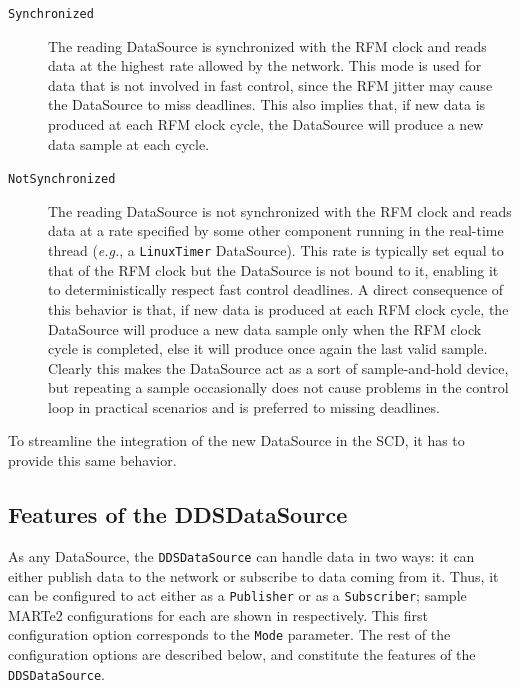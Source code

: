 \begin{description}
  \item[\texttt{Synchronized}] The reading DataSource is synchronized with the RFM clock and reads data at the highest rate allowed by the network. This mode is used for data that is not involved in fast control, since the RFM jitter may cause the DataSource to miss deadlines. This also implies that, if new data is produced at each RFM clock cycle, the DataSource will produce a new data sample at each cycle.
  \item[\texttt{NotSynchronized}] The reading DataSource is not synchronized with the RFM clock and reads data at a rate specified by some other component running in the real-time thread (\emph{e.g.}, a \texttt{LinuxTimer} DataSource). This rate is typically set equal to that of the RFM clock but the DataSource is not bound to it, enabling it to deterministically respect fast control deadlines. A direct consequence of this behavior is that, if new data is produced at each RFM clock cycle, the DataSource will produce a new data sample only when the RFM clock cycle is completed, else it will produce once again the last valid sample. Clearly this makes the DataSource act as a sort of sample-and-hold device, but repeating a sample occasionally does not cause problems in the control loop in practical scenarios and is preferred to missing deadlines.
\end{description}
To streamline the integration of the new DataSource in the SCD, it has to provide this same behavior.

\subsection{Features of the DDSDataSource}
\label{sec:ddsdatasource_features}
As any DataSource, the \texttt{DDSDataSource} can handle data in two ways: it can either publish data to the network or subscribe to data coming from it. Thus, it can be configured to act either as a \texttt{Publisher} or as a \texttt{Subscriber}; sample MARTe2 configurations for each are shown in  respectively. This first configuration option corresponds to the \texttt{Mode} parameter. The rest of the configuration options are described below, and constitute the features of the \texttt{DDSDataSource}.


